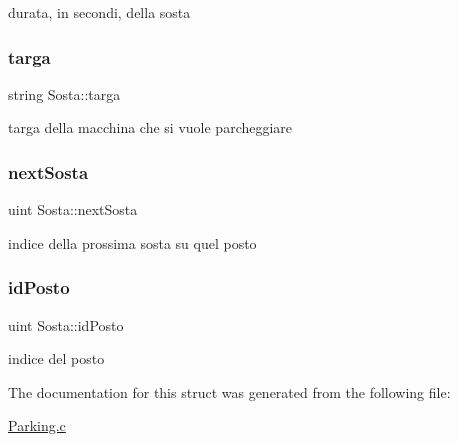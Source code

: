 durata, in secondi, della sosta \mbox{\label{struct_sosta_a90c31ad3a3b8a2d77d0eaac0927e0136}} 
\subsubsection{\texorpdfstring{targa}{targa}}
{\footnotesize\ttfamily string Sosta\+::targa}

targa della macchina che si vuole parcheggiare \mbox{\label{struct_sosta_a30359e54f529e95783fe1226389efe18}} 
\subsubsection{\texorpdfstring{next\+Sosta}{nextSosta}}
{\footnotesize\ttfamily uint Sosta\+::next\+Sosta}

indice della prossima sosta su quel posto \mbox{\label{struct_sosta_aace426c222cb003c1a2304f3d9cd2610}} 
\subsubsection{\texorpdfstring{id\+Posto}{idPosto}}
{\footnotesize\ttfamily uint Sosta\+::id\+Posto}

indice del posto 

The documentation for this struct was generated from the following file\+:\begin{DoxyCompactItemize}
\item 
\mbox{\hyperlink{_parking_8c}{Parking.\+c}}\end{DoxyCompactItemize}
